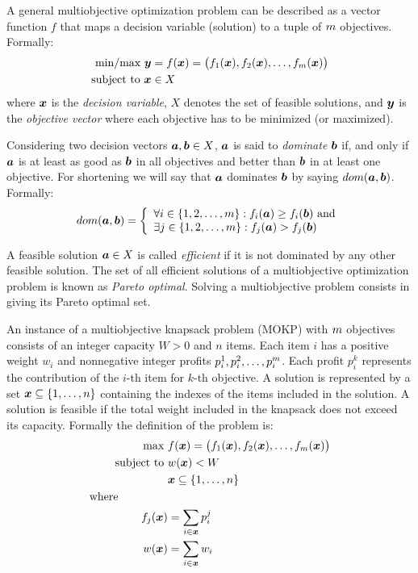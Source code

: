 A general multiobjective optimization problem can be described as a vector
function $f$ that maps a decision variable (solution) to a tuple
of $m$ objectives.
Formally:
\begin{align*}
  \text{min/max} ~ \boldsymbol{y} &= f(\boldsymbol{x}) = 
    \big(f_1(\boldsymbol{x})
    ,f_2(\boldsymbol{x})
    ,\ldots
    ,f_{m}(\boldsymbol{x})\big) \\
  \text{subject to} ~ \boldsymbol{x} & \in X
\end{align*}
where $\boldsymbol{x}$ is the \emph{decision variable}, $X$ denotes the set
of feasible solutions, and $\boldsymbol{y}$ is the \emph{objective vector} where
each objective has to be minimized (or maximized).

Considering two decision vectors $\boldsymbol{a}, \boldsymbol{b} \in X$, $\boldsymbol{a}$ is said to
\emph{dominate} $\boldsymbol{b}$ if, and only if $\boldsymbol{a}$ is at least as good as $\boldsymbol{b}$
in all objectives and better than $\boldsymbol{b}$ in at least one objective.
For shortening we will say that $\boldsymbol{a}$ dominates $\boldsymbol{b}$ by saying $dom(\boldsymbol{a}, \boldsymbol{b})$.
Formally:
\begin{displaymath}
    dom(\boldsymbol{a}, \boldsymbol{b}) = \left\{
      \begin{array}{l}
          \forall i \in \{1, 2, \ldots, m\}: f_i(\boldsymbol{a}) \geq f_i(\boldsymbol{b}) ~\text{and}\\
          \exists j \in \{1, 2, \ldots, m\}: f_j(\boldsymbol{a}) > f_j(\boldsymbol{b})
  \end{array} \right.
\end{displaymath}

A feasible solution $\boldsymbol{a} \in X$ is called \emph{efficient} %
if it is not dominated by any other feasible solution.
The set of all efficient solutions of a multiobjective optimization problem is
known as \emph{Pareto optimal}.
Solving a multiobjective problem consists in giving its Pareto optimal set.

An instance of a multiobjective knapsack problem (MOKP) with $m$
objectives consists of an integer capacity $W > 0$ and $n$ items.
Each item $i$ has a positive weight $w_i$ and nonnegative integer
profits $p_i^1, p_i^2, \ldots, p_{i}^{m}$.
Each profit $p_i^k$ represents the contribution of the $i$-th item for $k$-th objective.
A solution is represented by a set $\boldsymbol{x} \subseteq \{1, \ldots, n\}$
containing the indexes of the items included in the solution.
A solution is feasible if the total weight included in the knapsack does
not exceed its capacity.
Formally the definition of the problem is:
\begin{align*}
  \text{max   } & f(\boldsymbol{x}) = 
    \big(f_1(\boldsymbol{x}) ,f_2(\boldsymbol{x}) ,\ldots ,f_{m}(\boldsymbol{x})\big) \\
  \text{subject to   } & w(\boldsymbol{x}) < W \\
  & \boldsymbol{x} \subseteq \{1, \ldots, n\}\\
  \text{where} \phantom{mmmmm} \\
  f_j(\boldsymbol{x}) &= \sum_{i \in \boldsymbol{x}} p^j_i\\
  w(\boldsymbol{x}) &= \sum_{i \in \boldsymbol{x}} w_i
\end{align*}

